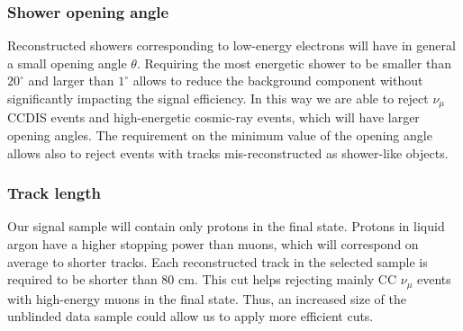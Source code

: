 \subsubsection{Shower opening angle}
Reconstructed showers corresponding to low-energy electrons will have in general a small opening angle $\theta$. Requiring the most energetic shower to be smaller than $20^{\circ}$ and larger than $1^{\circ}$ allows to reduce the background component without significantly impacting the signal efficiency. In this way we are able to reject $\nu_{\mu}$ CCDIS events and high-energetic cosmic-ray events, which will have larger opening angles. The requirement on the minimum value of the opening angle allows also to reject events with tracks mis-reconstructed as shower-like objects.

\subsubsection{Track length}
Our signal sample will contain only protons in the final state. Protons in liquid argon have a higher stopping power than muons, which will correspond on average to shorter tracks. Each reconstructed track in the selected sample is required to be shorter than 80 cm. This cut helps rejecting mainly CC $\nu_{\mu}$ events with high-energy muons in the final state.
Thus, an increased size of the unblinded data sample could allow us to apply more efficient cuts.



